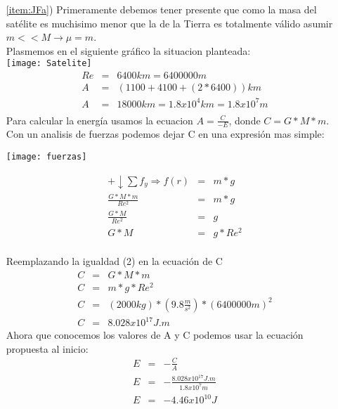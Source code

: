 \documentclass[12pt]{article}
\begin{document}
\begin{enumerate}
\begin{itemize}
  \item[\ref{item:JFa})]
  Primeramente debemos tener presente que como la masa del satélite es muchisimo menor que la de la Tierra es totalmente válido asumir $m<<M\rightarrow\mu=m$.\\
 Plasmemos en el siguiente gráfico la situacion planteada:\\
  \texttt{[image: Satelite]}\\
  \begin{eqnarray}
  Re&=&6400 km=6400000 m\nonumber\\ 
  A&=&(1100+4100+(2*6400)) km\nonumber\\
  A&=&18000  km = 1.8x10^4 km = 1.8x10^7 m\\
   \nonumber
 \end{eqnarray}
  Para calcular la energía usamos la ecuacion $A=\frac{C}{-E}$, donde $C=G*M*m$.\\
  Con un analisis de fuerzas podemos dejar C en una expresión mas simple:\\
  \begin{center}
   \begin{minipage}{0.4\linewidth}
    \texttt{[image: fuerzas]}
  \end{minipage} 
   \begin{minipage}{0.4\linewidth}
   \begin{eqnarray}
+\downarrow \sum f_y \Longrightarrow f(r)&=&m*g\nonumber\\
\frac{G*M*m}{Re^2}&=&m*g\nonumber\\
\frac{G*M}{Re^2}&=&g\nonumber\\
G*M&=&g*Re^2    \\
\nonumber
\end{eqnarray}    
\end{minipage}
\end{center}
Reemplazando la igualdad (2) en la ecuación de C\\
\begin{eqnarray}
C&=&G*M*m\nonumber\\
C&=&m*g*Re^2\nonumber\\
C&=&(2000 kg)*(9.8\frac{m}{s^2})*(6400000 m)^2\nonumber\\
C&=&8.028x10^{17} J.m
\end{eqnarray}
Ahora que conocemos los valores de A y C podemos usar la ecuación propuesta al inicio:\\
\begin{eqnarray}
E&=&-\frac{C}{A}\nonumber\\
E&=&-\frac{8.028x10^{17} J.m}{1.8x10^7 m}\nonumber\\
E&=&-4.46x10^{10} J
\end{eqnarray}
  

\end{itemize}
\end{enumerate}
\end{document}
